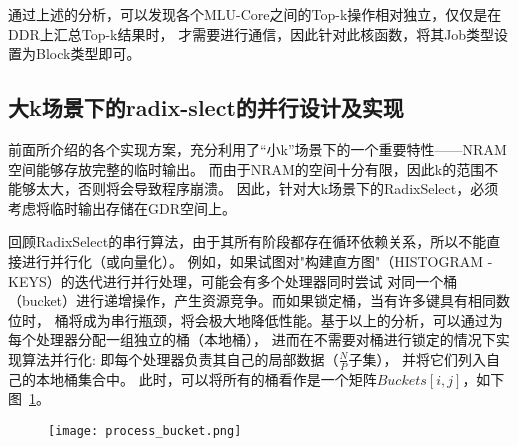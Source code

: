 通过上述的分析，可以发现各个MLU-Core之间的Top-k操作相对独立，仅仅是在DDR上汇总Top-k结果时，
才需要进行通信，因此针对此核函数，将其Job类型设置为Block类型即可。


  \subsection{大k场景下的radix-slect的并行设计及实现}

  前面所介绍的各个实现方案，充分利用了“小k”场景下的一个重要特性——NRAM空间能够存放完整的临时输出。
  而由于NRAM的空间十分有限，因此k的范围不能够太大，否则将会导致程序崩溃。
  因此，针对大k场景下的RadixSelect，必须考虑将临时输出存储在GDR空间上。
  
  回顾RadixSelect的串行算法，由于其所有阶段都存在循环依赖关系，所以不能直接进行并行化（或向量化）。
  例如，如果试图对"构建直方图"（HISTOGRAM - KEYS）的迭代进行并行处理，可能会有多个处理器同时尝试
  对同一个桶（bucket）进行递增操作，产生资源竞争。而如果锁定桶，当有许多键具有相同数位时，
  桶将成为串行瓶颈，将会极大地降低性能。基于以上的分析，可以通过为每个处理器分配一组独立的桶（本地桶），
进而在不需要对桶进行锁定的情况下实现算法并行化:
即每个处理器负责其自己的局部数据（\(\frac{N}{P}\)子集），
并将它们列入自己的本地桶集合中。
此时，可以将所有的桶看作是一个矩阵\(Buckets[i, j]\)，如下图~\ref{fig:process_bucket}。

\begin{figure}[ht]
    \centering
    \texttt{[image: process\_bucket.png]}
    \caption{}
    \label{fig:process_bucket}
\end{figure}

